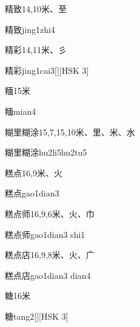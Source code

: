 \begin{entry}{精致}{14,10}{⽶、⾄}
  \begin{phonetics}{精致}{jing1zhi4}
  \end{phonetics}
\end{entry}

\begin{entry}{精彩}{14,11}{⽶、⼺}
  \begin{phonetics}{精彩}{jing1cai3}[][HSK 3]
  \end{phonetics}
\end{entry}

\begin{entry}{糆}{15}{⽶}
  \begin{phonetics}{糆}{mian4}
  \end{phonetics}
\end{entry}

\begin{entry}{糊里糊涂}{15,7,15,10}{⽶、⾥、⽶、⽔}
  \begin{phonetics}{糊里糊涂}{hu2li5hu2tu5}
  \end{phonetics}
\end{entry}

\begin{entry}{糕点}{16,9}{⽶、⽕}
  \begin{phonetics}{糕点}{gao1dian3}
  \end{phonetics}
\end{entry}

\begin{entry}{糕点师}{16,9,6}{⽶、⽕、⼱}
  \begin{phonetics}{糕点师}{gao1dian3 shi1}
  \end{phonetics}
\end{entry}

\begin{entry}{糕点店}{16,9,8}{⽶、⽕、⼴}
  \begin{phonetics}{糕点店}{gao1dian3 dian4}
  \end{phonetics}
\end{entry}

\begin{entry}{糖}{16}{⽶}
  \begin{phonetics}{糖}{tang2}[][HSK 3]
  \end{phonetics}
\end{entry}

